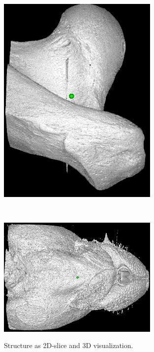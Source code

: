 \documentclass{article}
\begin{document}
\begin{figure}[h!]
\begin{minipage}[b]{0.5\textwidth}%
  \centering \vskip 0pt
  \begin{minipage}[b]{\textwidth}%
    \centering \vskip 0pt
    \includegraphics[width=0.7\textwidth]{images/bonemaskhigh_unprocessed.png}
    \label{fig:bonemaskhigh3d}
  \end{minipage}
  \\
  \begin{minipage}[b]{\textwidth}%
    \centering \vskip 0pt
    \includegraphics[width=0.7\textwidth]{images/head_of_mouse_unprocessed.png}
    \label{fig:headofmouse3d}
  \end{minipage}%
\end{minipage}%
  \caption{Structure as 2D-slice and 3D visualization.}\label{fig:real1}
\end{figure}
\end{document}
